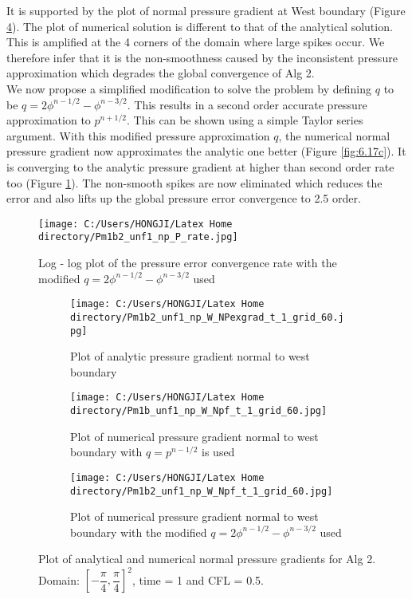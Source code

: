 It is supported by the plot of normal pressure gradient at West boundary (Figure \ref{fig:6.17b}). The plot of numerical solution is different to that of the analytical solution. This is amplified at the 4 corners of the domain where large spikes occur. We therefore infer that it is the non-smoothness caused by the inconsistent pressure approximation which degrades the global convergence of Alg 2.\\

We now propose a simplified modification to solve the problem by defining $q$ to be $q = 2\phi^{n-1/2} - \phi^{n-3/2}$. This results in a second order accurate pressure approximation to $p^{n+1/2}$. This can be shown using a simple Taylor series argument. With this modified pressure approximation $q$, the numerical normal pressure gradient now approximates the analytic one better (Figure \ref{fig:6.17c}). It is converging to the analytic pressure gradient at higher than second order rate too (Figure \ref{fig:6.16}). The non-smooth spikes are now eliminated which reduces the error and also lifts up the global pressure error convergence to 2.5 order.

\begin{figure}[H]
	\centering
	\texttt{[image: C:/Users/HONGJI/Latex Home directory/Pm1b2\_unf1\_np\_P\_rate.jpg]}
	\caption{Log - log plot of the pressure error convergence rate with the modified $q = 2\phi^{n-1/2} - \phi^{n-3/2}$ used }\label{fig:6.16}
\end{figure}

\begin{figure}[H]
	\centering
	\begin{subfigure}[t]{2.6in}
		\centering
		\texttt{[image: C:/Users/HONGJI/Latex Home directory/Pm1b2\_unf1\_np\_W\_NPexgrad\_t\_1\_grid\_60.jpg]}
		\caption{Plot of analytic pressure gradient normal to west boundary}\label{fig:6.17a}		
	\end{subfigure}
	\quad
	\begin{subfigure}[t]{2.2in}
		\centering
		\texttt{[image: C:/Users/HONGJI/Latex Home directory/Pm1b\_unf1\_np\_W\_Npf\_t\_1\_grid\_60.jpg]}
		\caption{Plot of numerical pressure gradient normal to west boundary with $q = p^{n-1/2}$ is used}\label{fig:6.17b}
	\end{subfigure}
	\quad
	\centering
	\begin{subfigure}[t]{2.5in}
		\centering
		\texttt{[image: C:/Users/HONGJI/Latex Home directory/Pm1b2\_unf1\_np\_W\_Npf\_t\_1\_grid\_60.jpg]}
		\caption{Plot of numerical pressure gradient normal to west boundary with the modified $q = 2\phi^{n-1/2} - \phi^{n-3/2}$ used}\label{fig:6.17b}		
	\end{subfigure}
	\caption{Plot of analytical and numerical normal pressure gradients for Alg 2. Domain: $[-\dfrac{\pi}{4}, \dfrac{\pi}{4}]^2$, time = 1 and CFL = 0.5.}\label{fig:6.17}
\end{figure}


